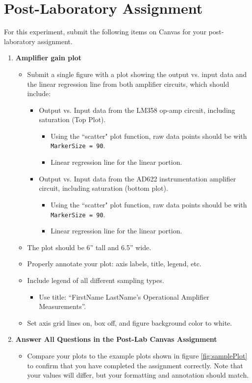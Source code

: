 \documentclass{article} %
\begin{document}
\section{Post-Laboratory Assignment}
For this experiment, submit the following items on Canvas for your post-laboratory assignment.
\begin{enumerate}
    \item \textbf{Amplifier gain plot}
    \begin{itemize}
        \item Submit a single figure with a plot showing the output vs. input data and the linear regression line from both amplifier circuits, which should include:
        \begin{itemize}
            \item Output vs. Input data from the LM358 op-amp circuit, including saturation (Top Plot). 
            \begin{itemize}
                \item Using the ``scatter" plot function, raw data points should be with \texttt{MarkerSize = 90}.
                \item Linear regression line for the linear portion.
            \end{itemize}
            \item Output vs. Input data from the AD622 instrumentation amplifier circuit, including saturation (bottom plot).
            \begin{itemize}
                \item Using the ``scatter" plot function, raw data points should be with \texttt{MarkerSize = 90}.
                \item Linear regression line for the linear portion.
            \end{itemize}
        \end{itemize} 
        \item The plot should be 6'' tall and 6.5'' wide.
        \item Properly annotate your plot: axis labels, title, legend, etc.
        \item Include legend of all different sampling types.
        \begin{itemize}
            \item Use title: ``FirstName LastName's Operational Amplifier Measurements''.
        \end{itemize}
        \item Set axis grid lines on, box off, and figure background color to white.
    \end{itemize}
    \item \textbf{Answer All Questions in the Post-Lab Canvas Assignment}
    \begin{itemize}
        \item Compare your plots to the example plots shown in figure \ref{fig:samplePlot} to confirm that you have completed the assignment correctly. Note that your values will differ, but your formatting and annotation should match.
    \end{itemize}
\end{enumerate}
\end{document}
